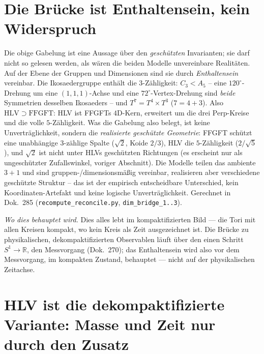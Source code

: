 \section{Die Br\"ucke ist Enthaltensein, kein Widerspruch}
Die obige Gabelung ist eine Aussage \"uber den \emph{gesch\"utzten} Invarianten; sie darf
nicht so gelesen werden, als w\"aren die beiden Modelle unvereinbare Realit\"aten. Auf der
Ebene der Gruppen und Dimensionen sind sie durch \emph{Enthaltensein} vereinbar. Die
Ikosaedergruppe enth\"alt die $3$-Z\"ahligkeit: $C_3<A_5$ -- eine $120^\circ$-Drehung um eine
$(1,1,1)$-Achse und eine $72^\circ$-Vertex-Drehung sind \emph{beide} Symmetrien desselben
Ikosaeders -- und $T^7=T^4\times T^3$ ($7=4+3$). Also $\mathrm{HLV}\supset\mathrm{FFGFT}$:
HLV ist FFGFTs $4$D-Kern, erweitert um die drei Perp-Kreise und die volle $5$-Z\"ahligkeit.
Was die Gabelung also belegt, ist keine Unvertr\"aglichkeit, sondern die \emph{realisierte
gesch\"utzte Geometrie}: FFGFT sch\"utzt eine unabh\"angige $3$-z\"ahlige Spalte ($\sqrt2$,
Koide $2/3$), HLV die $5$-Z\"ahligkeit ($2/\sqrt5$), und $\sqrt2$ ist nicht unter HLVs
gesch\"utzten Richtungen (es erscheint nur als ungesch\"utzter Zufallswinkel, voriger
Abschnitt). Die Modelle teilen das ambiente $3{+}1$ und sind gruppen-/dimensionsm\"a\ss ig
vereinbar, realisieren aber verschiedene gesch\"utzte Struktur -- das ist der empirisch
entscheidbare Unterschied, kein Koordinaten-Artefakt und keine logische Unvertr\"aglichkeit.
Gerechnet in Dok.~285 (\texttt{recompute\_reconcile.py}, \texttt{dim\_bridge\_1..3}).

\medskip\noindent\emph{Wo dies behauptet wird.} Dies alles lebt im kompaktifizierten Bild --- die Tori mit allen Kreisen kompakt, wo kein Kreis als Zeit ausgezeichnet ist. Die Br\"ucke zu physikalischen, dekompaktifizierten Observablen l\"auft \"uber den einen Schritt $S^1\to\mathbb{R}$, den Messvorgang (Dok.~270); das Enthaltensein wird also vor dem Messvorgang, im kompakten Zustand, behauptet --- nicht auf der physikalischen Zeitachse.

\section{HLV ist die dekompaktifizierte Variante: Masse und Zeit nur durch den Zusatz}

